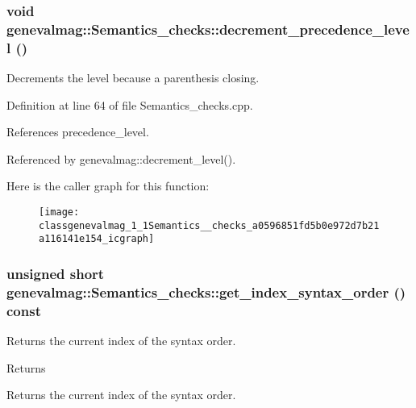\hypertarget{classgenevalmag_1_1Semantics__checks_a0596851fd5b0e972d7b21a116141e154}{
\subsubsection[{decrement\_\-precedence\_\-level}]{\setlength{\rightskip}{0pt plus 5cm}void genevalmag::Semantics\_\-checks::decrement\_\-precedence\_\-level ()}}
\label{classgenevalmag_1_1Semantics__checks_a0596851fd5b0e972d7b21a116141e154}
Decrements the level because a parenthesis closing. 

Definition at line 64 of file Semantics\_\-checks.cpp.



References precedence\_\-level.



Referenced by genevalmag::decrement\_\-level().



Here is the caller graph for this function:\nopagebreak
\begin{figure}[H]
\begin{center}
\leavevmode
\texttt{[image: classgenevalmag\_1\_1Semantics\_\_checks\_a0596851fd5b0e972d7b21a116141e154\_icgraph]}
\end{center}
\end{figure}


\hypertarget{classgenevalmag_1_1Semantics__checks_a6d51fcd1f3ed2d6bf5470de0fb5b7770}{
\subsubsection[{get\_\-index\_\-syntax\_\-order}]{\setlength{\rightskip}{0pt plus 5cm}unsigned short genevalmag::Semantics\_\-checks::get\_\-index\_\-syntax\_\-order () const}}
\label{classgenevalmag_1_1Semantics__checks_a6d51fcd1f3ed2d6bf5470de0fb5b7770}
Returns the current index of the syntax order. \begin{DoxyReturn}{Returns}

\end{DoxyReturn}
Returns the current index of the syntax order. 

